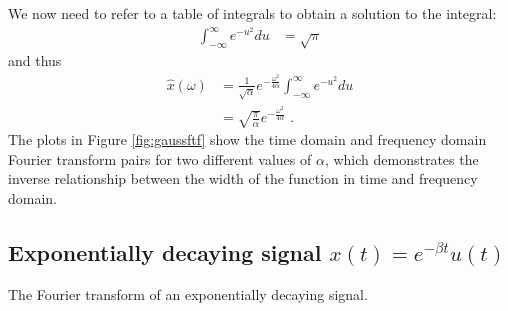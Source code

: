 We now need to refer to a table of integrals to obtain a solution to the integral:
\begin{align}
\int_{-\infty}^{\infty} e^{-u^2} du &= \sqrt{\pi}
\end{align}
and thus
\begin{align}
\hat{x}(\omega) &= \frac{1}{\sqrt{\alpha}}e^{-\frac{\omega^2}{4\alpha}} \int_{-\infty}^{\infty} e^{-u^2} du\\
&=\sqrt{\frac{\pi}{\alpha}} e^{-\frac{\omega^2}{4\alpha}}\,\,.
\end{align}
The plots in Figure \ref{fig:gaussftf} show the time domain and frequency domain Fourier transform pairs for two different values of $\alpha$, which demonstrates the inverse relationship between the width of the function in time and frequency domain.

\subsection{Exponentially decaying signal $x(t) = e^{-\beta t}u(t)$}

\begin{marginfigure}
\begin{center}


\end{center}
\caption{The Fourier transform of an exponentially decaying signal.}
\end{marginfigure}


